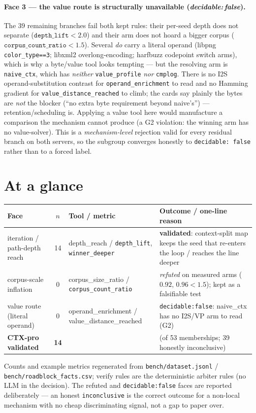 \documentclass[11pt]{article}
\begin{document}
\paragraph{Face 3 --- the value route is structurally unavailable
(\emph{decidable:\,false}).} The 39 remaining branches fail both kept rules:
their per-seed depth does not separate ($\texttt{depth\_lift}<2.0$) and their arm
does not hoard a bigger corpus ($\texttt{corpus\_count\_ratio}<1.5$). Several
\emph{do} carry a literal operand (libpng \texttt{color\_type==3}; libxml2
overlong-encoding; harfbuzz codepoint switch arms), which is why a byte/value
tool looks tempting --- but the resolving arm is \texttt{naive\_ctx}, which has
\emph{neither} \texttt{value\_profile} \emph{nor} \texttt{cmplog}. There is no
I2S operand-substitution contrast for \texttt{operand\_enrichment} to read and no
Hamming gradient for \texttt{value\_distance\_reached} to climb; the cards say
plainly the bytes are \emph{not} the blocker (``no extra byte requirement beyond
naive's'') --- retention/scheduling is. Applying a value tool here would
manufacture a comparison the mechanism cannot produce (a G2 violation: the
winning arm has no value-solver). This is a \emph{mechanism-level} rejection
valid for every residual branch on both servers, so the subgroup converges
honestly to \texttt{decidable:\,false} rather than to a forced label.

\section*{At a glance}
\begin{center}\small
\begin{tabular}{@{}p{3.8cm}clp{5.2cm}@{}}
\toprule
\textbf{Face} & \textbf{$n$} & \textbf{Tool / metric} & \textbf{Outcome / one-line reason} \\
\midrule
iteration / path-depth reach & 14 & depth\_reach / \texttt{depth\_lift}, \texttt{winner\_deeper} & \textbf{validated}: context-split map keeps the seed that re-enters the loop / reaches the line deeper \\
corpus-scale inflation        & 0  & corpus\_size\_ratio / \texttt{corpus\_count\_ratio} & \emph{refuted} on measured arms ($0.92$, $0.96 < 1.5$); kept as a falsifiable test \\
value route (literal operand) & 0  & operand\_enrichment / value\_distance\_reached & \texttt{decidable:false}: naive\_ctx has no I2S/VP arm to read (G2) \\
\midrule
\textbf{CTX-pro validated}    & \textbf{14} & & (of 53 memberships; 39 honestly inconclusive) \\
\bottomrule
\end{tabular}
\end{center}

\noindent\footnotesize Counts and example metrics regenerated from
\texttt{bench/dataset.jsonl} / \texttt{bench/roadblock\_facts.csv}; verify rules
are the deterministic arbiter rules (no LLM in the decision). The refuted and
\texttt{decidable:false} faces are reported deliberately --- an honest
\texttt{inconclusive} is the correct outcome for a non-local mechanism with no
cheap discriminating signal, not a gap to paper over.
\end{document}
